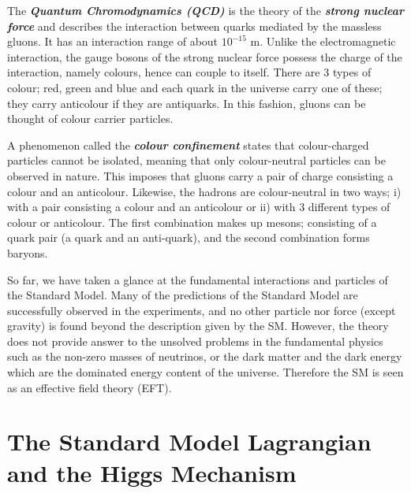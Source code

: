 The \textbf{\emph{Quantum Chromodynamics (QCD)}} is the theory of the \textbf{\textit{strong nuclear force}} and describes the interaction between quarks mediated by the massless gluons. It has an interaction range of about $10^{-15}$ m. Unlike the electromagnetic interaction, the gauge bosons of the strong nuclear force possess the charge of the interaction, namely colours, hence can couple to itself. There are 3 types of colour; red, green and blue and each quark in the universe carry one of these; they carry anticolour if they are antiquarks. In this fashion, gluons can be thought of colour carrier particles.

A phenomenon called the \textbf{\emph{colour confinement}} states that colour-charged particles cannot be isolated, meaning that only colour-neutral particles can be observed in nature\footnotemark. This imposes that gluons carry a pair of charge consisting a colour and an anticolour. Likewise, the hadrons are colour-neutral in two ways; i) with a pair consisting a colour and an anticolour or ii) with 3 different types of colour or anticolour. The first combination makes up mesons; consisting of a quark pair (a quark and an anti-quark), and the second combination forms baryons.


So far, we have taken a glance at the fundamental interactions and particles of the Standard Model. Many of the predictions of the Standard Model are successfully observed in the experiments, and no other particle nor force (except gravity) is found beyond the description given by the SM. However, the theory does not provide answer to the unsolved problems in the fundamental physics such as the non-zero masses of neutrinos\cite{neutrino-mass}, or the dark matter and the dark energy\cite{PlanckCol} which are the dominated energy content of the universe. Therefore the SM is seen as an effective field theory (EFT)\footnotemark.


\section{The Standard Model Lagrangian and the Higgs Mechanism}

